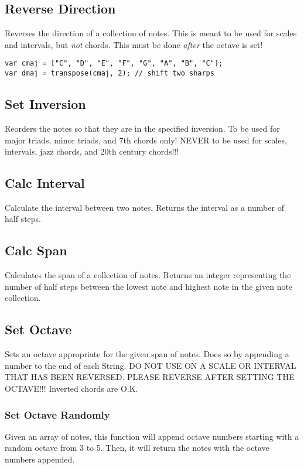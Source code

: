 \documentclass{article}
\begin{document}
\subsection{Reverse Direction}
Reverses the direction of a collection of notes. This is meant to be used for scales and intervals, but \textit{not} chords. This must be done \textit{after} the octave is set!

\begin{lstlisting}
var cmaj = ["C", "D", "E", "F", "G", "A", "B", "C"];
var dmaj = transpose(cmaj, 2); // shift two sharps
\end{lstlisting}

\subsection{Set Inversion}
Reorders the notes so that they are in the specified inversion. To be used for major triads, minor triads, and 7th chords only! NEVER to be used for scales, intervals, jazz chords, and 20th century chords!!!
 
\subsection{Calc Interval}
Calculate the interval between two notes. Returns the interval as a number of half steps.

\subsection{Calc Span}
Calculates the span of a collection of notes. Returns an integer representing the number of half steps between the lowest note and highest note in the given note collection.

\subsection{Set Octave}
Sets an octave appropriate for the given span of notes. Does so by appending a number to the end of each String. DO NOT USE ON A SCALE OR INTERVAL THAT HAS BEEN REVERSED. PLEASE REVERSE AFTER SETTING THE OCTAVE!!! Inverted chords are O.K.


\subsubsection{Set Octave Randomly}
Given an array of notes, this function will append octave numbers starting with a random octave from 3 to 5. Then, it will return the notes with the octave numbers appended.
\end{document}
